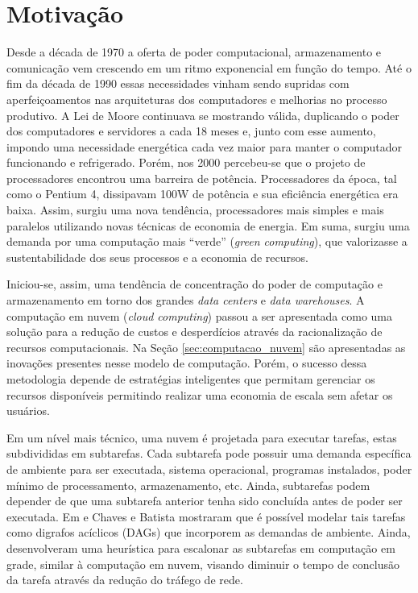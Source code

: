 \section{Motivação}
\label{sec:motivacao}
Desde a década de 1970 a oferta de poder computacional, armazenamento e
comunicação vem crescendo em um ritmo exponencial em função do tempo. Até o fim da
década de 1990 essas necessidades vinham sendo supridas com aperfeiçoamentos nas
arquiteturas dos computadores e melhorias no processo produtivo. A Lei de Moore
continuava se mostrando válida, duplicando o poder dos computadores e servidores
a cada 18 meses e, junto com esse aumento, impondo uma necessidade energética
cada vez maior para manter o computador funcionando e refrigerado. Porém, 
nos 2000 percebeu-se que o projeto de processadores encontrou uma
barreira de potência. Processadores da época, tal como o Pentium 4, dissipavam
100W de potência e sua eficiência energética era baixa. \cite{patterson:computer_organization}
Assim, surgiu uma nova tendência, processadores mais simples e mais paralelos
utilizando novas técnicas de economia de energia. Em suma, surgiu uma demanda
por uma computação mais ``verde'' (\emph{green computing}), que valorizasse a
sustentabilidade dos seus processos e a economia de recursos.

Iniciou-se, assim, uma tendência de concentração do poder de computação e 
armazenamento em torno dos grandes \emph{data centers} e \emph{data warehouses}.
A computação em nuvem (\emph{cloud computing}) passou a ser apresentada como
uma solução para a redução de custos e desperdícios através da
racionalização de recursos computacionais. Na Seção \ref{sec:computacao_nuvem}
são apresentadas as inovações presentes nesse modelo de computação. Porém, o 
sucesso dessa metodologia depende de estratégias inteligentes que permitam 
gerenciar os recursos disponíveis permitindo realizar uma economia de escala
sem afetar os usuários.

Em um nível mais técnico, uma nuvem é projetada para executar tarefas, estas
subdivididas em subtarefas. Cada subtarefa pode possuir uma demanda específica
de ambiente para ser executada, sistema operacional, programas instalados, poder
mínimo de processamento, armazenamento, etc. Ainda, subtarefas podem depender de
que uma subtarefa anterior tenha sido concluída antes de poder ser executada. Em
\cite{chaves:scheduling_software_requirements} e 
\cite{batista:embedding_software_requirements} Chaves e Batista mostraram que é 
possível modelar tais tarefas como digrafos acíclicos (DAGs) que incorporem as
demandas de ambiente. Ainda, desenvolveram uma heurística para escalonar as
subtarefas em computação em grade, similar à computação
em nuvem, visando diminuir o tempo de conclusão da tarefa através da redução
do tráfego de rede.


